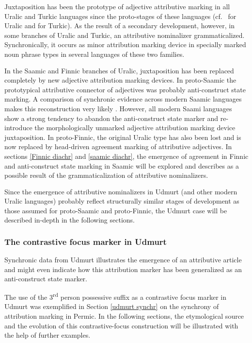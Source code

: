 Juxtaposition has been the prototype of adjective attributive marking in all Uralic and Turkic languages since the proto-stages of these languages (cf.~\citealt[80–81]{decsy1990} for Uralic and \citealt[75–76]{decsy1998} for Turkic). As the result of a secondary development, however, in some branches of Uralic and Turkic, an attributive nominalizer grammaticalized. Synchronically, it occurs as minor attribution marking device in specially marked noun phrase types in several languages of these two families.%

In the Saamic and Finnic branches of Uralic, juxtaposition has been replaced completely by new adjective attribution marking devices. In proto-Saamic the prototypical attributive connector of adjectives was probably anti-construct state marking. A comparison of synchronic evidence across modern Saamic languages makes this reconstruction very likely  \citep{riesler2006b}. However, all modern Saami languages show a strong tendency to abandon the anti-construct state marker and re-introduce the morphologically unmarked adjective attribution marking device juxtaposition. In proto-Finnic, the original Uralic type has also been lost and is now replaced by head-driven agreement marking of attributive adjectives. In sections \ref{Finnic diachr} and \ref{saamic diachr}, the emergence of agreement in Finnic and anti-construct state marking in Saamic will be explored and describes as a possible result of the grammaticalization of attributive nominalizers. 

Since the emergence of attributive nominalizers in Udmurt (and other modern Uralic languages) probably reflect structurally similar stages of development as those assumed for proto-Saamic and proto-Finnic, the Udmurt case will be described in-depth in the following sections.

\subsubsection{The contrastive focus marker in Udmurt} \label{udmurt diachr}

Synchronic data from Udmurt illustrates the emergence of an attributive article and might even indicate how this attribution marker has been generalized as an anti-construct state marker. 

The use of the 3\textsuperscript{rd} person possessive suffix as a contrastive focus marker in Udmurt was exemplified in Section \ref{udmurt synchr} on the synchrony of attribution marking in Permic. In the following sections, the etymological source and the evolution of this contrastive-focus construction will be illustrated with the help of further examples.


